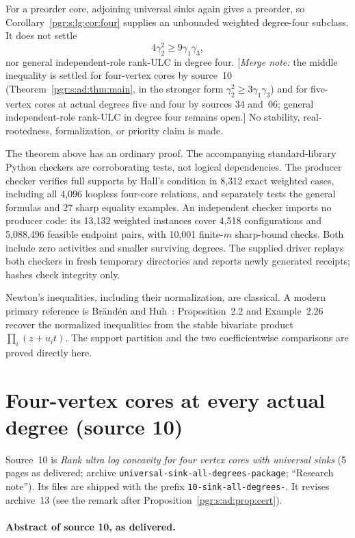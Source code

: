 \documentclass[11pt]{article}
\numberwithin{equation}{section}
\theoremstyle{definition}\newtheorem{definition}[theorem]{Definition}\newtheorem{remark}[theorem]{Remark}
\newcommand{\mnote}[1]{[\textit{Merge note:} #1]}
\begin{document}
For a preorder core, adjoining universal sinks again gives a preorder, so Corollary~\ref{pgr:s:lg:cor:four} supplies an unbounded weighted degree-four subclass. It does not settle
\[
 4\gamma_2^2\ge9\gamma_1\gamma_3,
\]
nor general independent-role rank-ULC in degree four.
\mnote{the middle inequality is settled for four-vertex cores by source~10
(Theorem~\ref{pgr:s:ad:thm:main}, in the stronger form
$\gamma_2^2\ge3\gamma_1\gamma_3$) and for five-vertex cores at actual
degrees five and four by sources 34 and~06; general independent-role
rank-ULC in degree four remains open.}
 No stability, real-rootedness, formalization, or priority claim is made.

The theorem above has an ordinary proof. The accompanying standard-library Python checkers are corroborating tests, not logical dependencies. The producer checker verifies full supports by Hall's condition in 8,312 exact weighted cases, including all 4,096 loopless four-core relations, and separately tests the general formulas and 27 sharp equality examples. An independent checker imports no producer code: its 13,132 weighted instances cover 4,518 configurations and 5,088,496 feasible endpoint pairs, with 10,001 finite-$m$ sharp-bound checks. Both include zero activities and smaller surviving degrees. The supplied driver replays both checkers in fresh temporary directories and reports newly generated receipts; hashes check integrity only.

Newton's inequalities, including their normalization, are classical. A modern primary reference is Br\"and\'en and Huh~\cite{BH}: Proposition~2.2 and Example~2.26 recover the normalized inequalities from the stable bivariate product $\prod_i(z+u_it)$. The support partition and the two coefficientwise comparisons are proved directly here.


\section{Four-vertex cores at every actual degree (source 10)}\label{pgr:s:ad:sec}

Source~10 is \emph{Rank ultra log concavity for four vertex cores with
universal sinks} (5 pages as delivered; archive
\texttt{universal-sink-all-degrees-package}; ``Research note''). Its files
are shipped with the prefix \texttt{10-sink-all-degrees-}. It revises
archive~13 (see the remark after Proposition~\ref{pgr:s:ad:prop:cert}).

\paragraph{Abstract of source 10, as delivered.}
\end{document}
